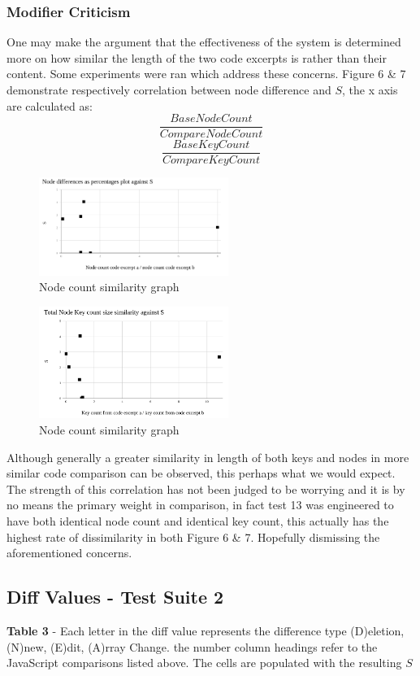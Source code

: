 \documentclass[jou,apacite]{apa6}
\begin{document}
\subsubsection{Modifier Criticism}
One may make the argument that the effectiveness of the system is determined more on how similar the length of the two code excerpts is rather than their content. Some experiments were ran which address these concerns. Figure 6 \& 7 demonstrate respectively correlation between node difference and $S$, the x axis are calculated as: \[\dfrac{Base Node Count }{Compare Node Count}\] \[\dfrac{Base Key Count }{Compare Key Count}\]

				\begin{figure}[h]
\caption{Node count similarity graph}
\centering
\includegraphics[width=0.55\textwidth]{nodecount}
\end{figure}

				\begin{figure}[h]
\caption{Node count similarity graph}
\centering
\includegraphics[width=0.55\textwidth]{keycount}
\end{figure}

Although generally a greater similarity in length of both keys and nodes in more similar code comparison can be observed, this perhaps what we would expect. The strength of this correlation has not been judged to be worrying and it is by no means the primary weight in comparison, in fact test 13 was engineered to have both identical node count and identical key count, this actually has the highest rate of dissimilarity in both Figure 6 \& 7. Hopefully dismissing the aforementioned concerns.

\subsection{Diff Values - Test Suite 2}
\textbf{Table 3} - Each letter in the diff value represents the difference type (D)eletion, (N)new, (E)dit, (A)rray Change. the number column headings refer to the JavaScript comparisons listed above. The cells are populated with the resulting $S$
\end{document}
